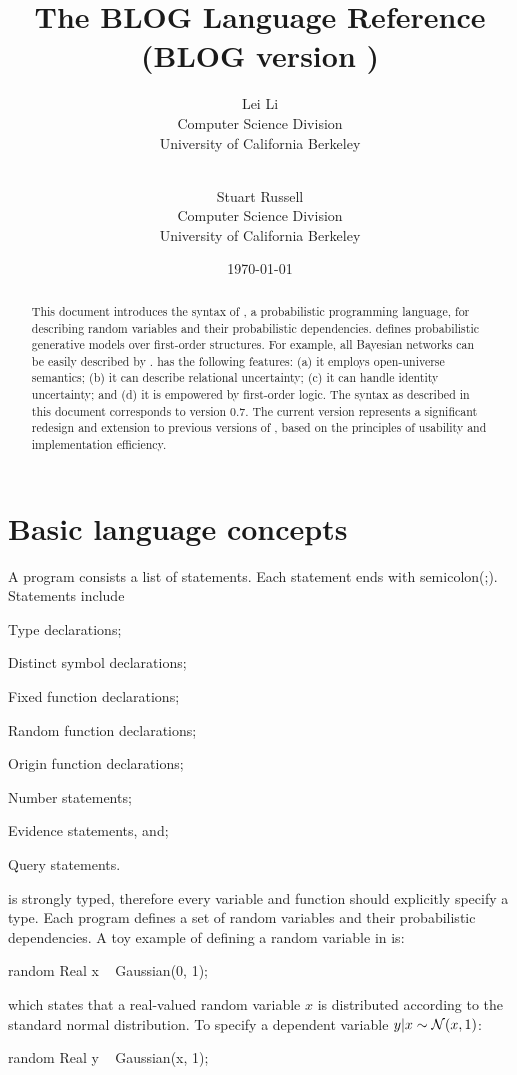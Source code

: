 \documentclass[12pt]{article}
\title{The BLOG Language Reference  \\
{\large (BLOG version \blogversion)}
}
\author{Lei Li\\
              Computer Science Division\\
              University of California Berkeley\\
               \email{leili@cs.berkeley.edu}\\
\and
               Stuart Russell\\
              Computer Science Division\\
              University of California Berkeley\\
               \email{russell@cs.berkeley.edu}
               }
\date{\today}
\newcommand{\blogversion}{0.7\xspace}
\begin{document}
\maketitle


\begin{abstract}
This document introduces the syntax of \bl, a probabilistic programming language, for describing random variables and their probabilistic dependencies.  
\bl defines probabilistic generative models over first-order structures. For example, all Bayesian networks can be easily described by \bl.  
\bl has the following features: 
(a) it employs open-universe semantics;
(b) it can describe relational uncertainty;
(c) it can handle identity uncertainty; and
(d) it is empowered by first-order logic.
The syntax as described in this document corresponds to \bl version \blogversion. The current version represents a significant redesign and extension to previous versions of \bl, based on the principles of usability and implementation efficiency.
\end{abstract}

\clearpage

\tableofcontents

\clearpage

\section{Basic language concepts}
A \bl program consists a list of statements.
Each statement ends with semicolon(;). 
Statements include 
\begin{enumerate*}
\item Type declarations; 
\item Distinct symbol declarations;
\item Fixed function declarations;
\item Random function declarations;
\item Origin function declarations;
\item Number statements;
\item Evidence statements, and;
\item Query statements.
\end{enumerate*}

\bl is strongly typed, therefore every variable and function should explicitly specify a type.
Each \bl program defines a set of random variables and their probabilistic dependencies. 
A toy example of defining a random variable in \bl is:

\begin{blogcode}
random Real x ~ Gaussian(0, 1);
\end{blogcode}
which states that a real-valued random variable $x$ is distributed according to the standard normal distribution. 
To specify a dependent variable $y | x \sim \mathcal{N}(x, 1)$:
\begin{blogcode}
random Real y ~ Gaussian(x, 1);
\end{blogcode}
\end{document}
